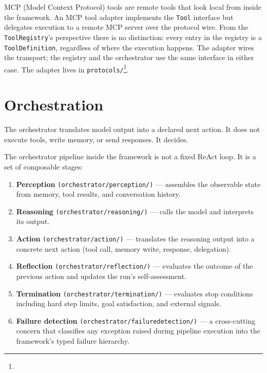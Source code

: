 MCP (Model Context Protocol) tools are remote tools that look local from inside the
framework.
An MCP tool adapter implements the \texttt{Tool} interface but delegates execution
to a remote MCP server over the protocol wire.
From the \texttt{ToolRegistry}'s perspective there is no distinction: every entry
in the registry is a \texttt{ToolDefinition}, regardless of where the execution happens.
The adapter wires the transport; the registry and the orchestrator use the same
interface in either case.
The adapter lives in
\texttt{protocols/}\footnote{}.

\section{Orchestration}
\label{sec:orchestrator}

The orchestrator translates model output into a declared next action.
It does not execute tools, write memory, or send responses.
It decides.

The orchestrator pipeline inside the framework is not a fixed ReAct loop.
It is a set of composable stages:

\begin{enumerate}
  \item \textbf{Perception} \texttt{(orchestrator/perception/)} — assembles the
        observable state from memory, tool results, and conversation history.
  \item \textbf{Reasoning} \texttt{(orchestrator/reasoning/)} — calls the model
        and interprets its output.
  \item \textbf{Action} \texttt{(orchestrator/action/)} — translates the reasoning
        output into a concrete next action (tool call, memory write, response,
        delegation).
  \item \textbf{Reflection} \texttt{(orchestrator/reflection/)} — evaluates the
        outcome of the previous action and updates the run's self-assessment.
  \item \textbf{Termination} \texttt{(orchestrator/termination/)} — evaluates
        stop conditions including hard step limits, goal satisfaction, and
        external signals.
  \item \textbf{Failure detection} \texttt{(orchestrator/failuredetection/)} —
        a cross-cutting concern that classifies any exception raised during
        pipeline execution into the framework's typed failure hierarchy.
\end{enumerate}

